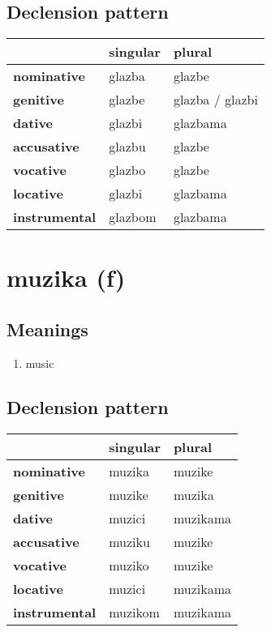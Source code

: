 \subsection*{Declension pattern}
\begin{tabularx}{\linewidth}{Xll}
\toprule
{} & singular &           plural \\
\midrule
\textbf{nominative  } &   glazba &           glazbe \\
\textbf{genitive    } &   glazbe &  glazba / glazbi \\
\textbf{dative      } &   glazbi &         glazbama \\
\textbf{accusative  } &   glazbu &           glazbe \\
\textbf{vocative    } &   glazbo &           glazbe \\
\textbf{locative    } &   glazbi &         glazbama \\
\textbf{instrumental} &  glazbom &         glazbama \\
\bottomrule
\end{tabularx}

\filbreak
\section{muzika (f)}
\subsection*{Meanings}
\begin{enumerate}
\item music
\end{enumerate}
\subsection*{Declension pattern}
\begin{tabularx}{\linewidth}{Xll}
\toprule
{} & singular &    plural \\
\midrule
\textbf{nominative  } &   muzika &    muzike \\
\textbf{genitive    } &   muzike &    muzika \\
\textbf{dative      } &   muzici &  muzikama \\
\textbf{accusative  } &   muziku &    muzike \\
\textbf{vocative    } &   muziko &    muzike \\
\textbf{locative    } &   muzici &  muzikama \\
\textbf{instrumental} &  muzikom &  muzikama \\
\bottomrule
\end{tabularx}

